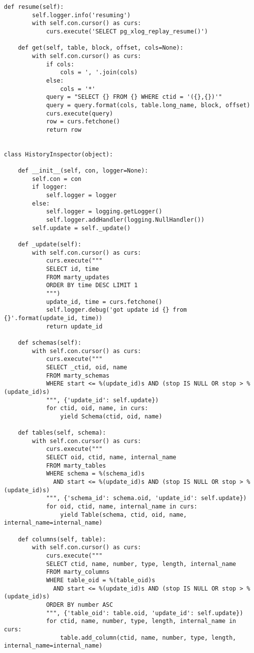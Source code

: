 \begin{lstlisting}[caption={utils/inspector.py}]
    def resume(self):
        self.logger.info('resuming')
        with self.con.cursor() as curs:
            curs.execute('SELECT pg_xlog_replay_resume()')

    def get(self, table, block, offset, cols=None):
        with self.con.cursor() as curs:
            if cols:
                cols = ', '.join(cols)
            else:
                cols = '*'
            query = "SELECT {} FROM {} WHERE ctid = '({},{})'"
            query = query.format(cols, table.long_name, block, offset)
            curs.execute(query)
            row = curs.fetchone()
            return row


class HistoryInspector(object):

    def __init__(self, con, logger=None):
        self.con = con
        if logger:
            self.logger = logger
        else:
            self.logger = logging.getLogger()
            self.logger.addHandler(logging.NullHandler())
        self.update = self._update()

    def _update(self):
        with self.con.cursor() as curs:
            curs.execute("""
            SELECT id, time
            FROM marty_updates
            ORDER BY time DESC LIMIT 1
            """)
            update_id, time = curs.fetchone()
            self.logger.debug('got update id {} from {}'.format(update_id, time))
            return update_id

    def schemas(self):
        with self.con.cursor() as curs:
            curs.execute("""
            SELECT _ctid, oid, name
            FROM marty_schemas
            WHERE start <= %(update_id)s AND (stop IS NULL OR stop > %(update_id)s)
            """, {'update_id': self.update})
            for ctid, oid, name, in curs:
                yield Schema(ctid, oid, name)

    def tables(self, schema):
        with self.con.cursor() as curs:
            curs.execute("""
            SELECT oid, ctid, name, internal_name
            FROM marty_tables
            WHERE schema = %(schema_id)s
              AND start <= %(update_id)s AND (stop IS NULL OR stop > %(update_id)s)
            """, {'schema_id': schema.oid, 'update_id': self.update})
            for oid, ctid, name, internal_name in curs:
                yield Table(schema, ctid, oid, name, internal_name=internal_name)

    def columns(self, table):
        with self.con.cursor() as curs:
            curs.execute("""
            SELECT ctid, name, number, type, length, internal_name
            FROM marty_columns
            WHERE table_oid = %(table_oid)s
              AND start <= %(update_id)s AND (stop IS NULL OR stop > %(update_id)s)
            ORDER BY number ASC
            """, {'table_oid': table.oid, 'update_id': self.update})
            for ctid, name, number, type, length, internal_name in curs:
                table.add_column(ctid, name, number, type, length, internal_name=internal_name)
\end{lstlisting}